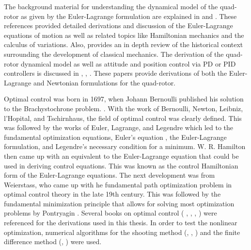 The background material for understanding the dynamical model of the quad-rotor as given by the Euler-Lagrange formulation are explained in \cite{marion1995classical} and  \cite{cornelius1970variational}. These references provided detailed derivations and discussion of the Euler-Lagrange equations of motion as well as related topics like Hamiltonian mechanics and the calculus of variations. Also, \cite{cornelius1970variational} provides an in depth review of the historical context surrounding the development of classical mechanics. The derivation of the quad-rotor dynamical model as well as attitude and position control via PD or PID controllers is discussed in \cite{erginer2007modeling}, \cite{bouabdallah2004pid}, \cite{Luukkonen}. These papers provide derivations of both the Euler-Lagrange and Newtonian formulations for the quad-rotor.

Optimal control was born in 1697, when Johann Bernoulli published his solution to the Brachystochrone problem. \cite{JBernoulli} . With the work of Bernoulli, Newton, Leibniz, l'Hopital, and Tschirnhaus, the field of optimal control was clearly defined. This was followed by the works of Euler, Lagrange, and Legendre which led to the fundamental optimization equations, Euler's equation \cite{LEuler}, the Euler-Lagrange formulation, and Legendre's necessary condition for a minimum. W. R. Hamilton then came up with an equivalent to the Euler-Lagrange equation that could be used in deriving control equations. This was known as the control Hamiltonian form of the Euler-Lagrange equations. The next development was from Weierstass, who came up with he fundamental path optimization problem in optimal control theory in the late 19th century. This was followed by the fundamental minimization principle that allows for solving most optimization problems by Pontryagin \cite{Pontry}. Several books on optimal control (\cite{lewis2012optimal} , \cite{BrysonHo69}, \cite{locatelli2001optimal}, \cite{athans2006optimal}) were referenced for the derivations used in this thesis. In order to test the nonlinear optimization, numerical algorithms for the shooting method (\cite{richard1988douglas}, \cite{rao2009engineering}, \cite{keller1992numerical}) and the finite difference method (\cite{rao2009engineering}, \cite{keller1992numerical}) were used. 

